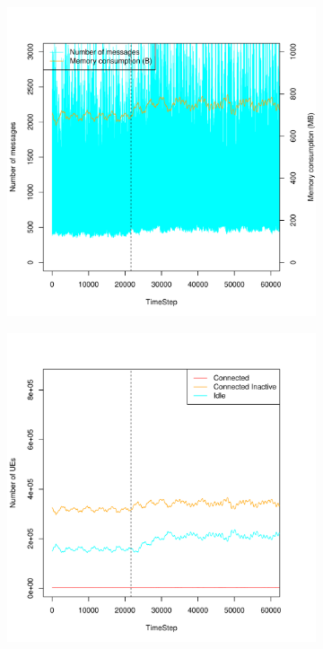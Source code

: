 \documentclass[a4j]{ujarticle}
\begin{document}
\begin{figure}[htbp]
\begin{subfigure}{0.49\hsize}
   \label{subfig:scenario_6_idleTimer_345600_691200_1-8_0-00045_1800_0_ideal_add_80000}
 \end{subfigure}
 \par\bigskip %
 \begin{subfigure}{0.49\hsize}
   \centering
   \includegraphics[width=1.0\hsize]{scenario_6_signaling_and_memoryload_vs_timeStep_345600_691200_1-8_0-00045_1800_0_ideal_add_80000.pdf}
   \label{subfig:scenario_6_signaling_and_memoryload_vs_timeStep_345600_691200_1-8_0-00045_1800_0_ideal_add_80000}
 \end{subfigure}
 \begin{subfigure}{0.49\hsize}
   \centering
   \includegraphics[width=1.0\hsize]{scenario_6_stateBreakdown_345600_691200_1-8_0-00045_1800_0_ideal_add_80000.pdf}

\end{subfigure}
\end{figure}
\end{document}
